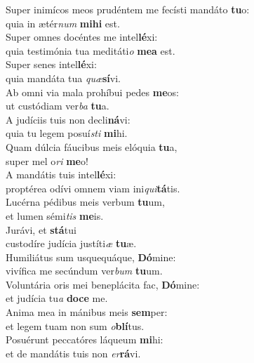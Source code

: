 \evenverse Super inimícos meos prudéntem me fecísti mandáto \textbf{tu}o:~\*\\
\evenverse quia in ætér\textit{num} \textbf{mi}\textbf{hi} est.\\
\oddverse Super omnes docéntes me intel\textbf{lé}xi:~\*\\
\oddverse quia testimónia tua meditáti\textit{o} \textbf{me}\textbf{a} est.\\
\evenverse Super senes intel\textbf{lé}xi:~\*\\
\evenverse quia mandáta tua \textit{quæ}\textbf{sí}vi.\\
\oddverse Ab omni via mala prohíbui pedes \textbf{me}os:~\*\\
\oddverse ut custódiam ver\textit{ba} \textbf{tu}a.\\
\evenverse A judíciis tuis non decli\textbf{ná}vi:~\*\\
\evenverse quia tu legem posuí\textit{sti} \textbf{mi}hi.\\
\oddverse Quam dúlcia fáucibus meis elóquia \textbf{tu}a,~\*\\
\oddverse super mel o\textit{ri} \textbf{me}o!\\
\evenverse A mandátis tuis intel\textbf{lé}xi:~\*\\
\evenverse proptérea odívi omnem viam ini\textit{qui}\textbf{tá}tis.\\
\oddverse Lucérna pédibus meis verbum \textbf{tu}um,~\*\\
\oddverse et lumen sémi\textit{tis} \textbf{me}is.\\
\evenverse Jurávi, et \textbf{stá}tui~\*\\
\evenverse custodíre judícia justíti\textit{æ} \textbf{tu}æ.\\
\oddverse Humiliátus sum usquequáque, \textbf{Dó}mine:~\*\\
\oddverse vivífica me secúndum ver\textit{bum} \textbf{tu}um.\\
\evenverse Voluntária oris mei beneplácita fac, \textbf{Dó}mine:~\*\\
\evenverse et judícia tu\textit{a} \textbf{do}\textbf{ce} me.\\
\oddverse Anima mea in mánibus meis \textbf{sem}per:~\*\\
\oddverse et legem tuam non sum \textit{o}\textbf{blí}tus.\\
\evenverse Posuérunt peccatóres láqueum \textbf{mi}hi:~\*\\
\evenverse et de mandátis tuis non \textit{er}\textbf{rá}vi.\\
